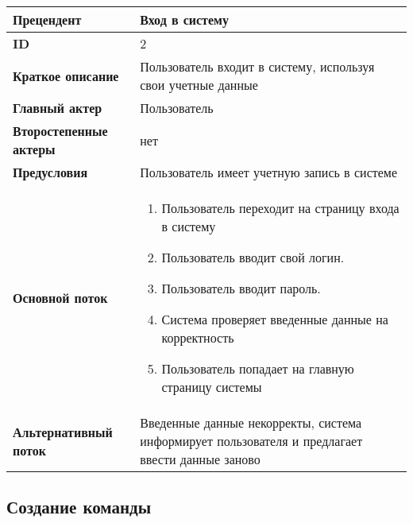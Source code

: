 \begin{tabular}{|l|p{9cm}|}
	\hline
	\textbf{Прецендент}            & Вход в систему                                                                                  \\
	\hline
	\textbf{ID}                    & 2                                                                                               \\
	\hline
	\textbf{Краткое описание}      & Пользователь входит в систему, используя свои учетные данные                                    \\
	\hline
	\textbf{Главный актер}         & Пользователь                                                                                    \\
	\hline
	\textbf{Второстепенные актеры} & нет                                                                                             \\
	\hline
	\textbf{Предусловия}           & Пользователь имеет учетную запись в системе                                                     \\
	\hline
	\textbf{Основной поток}        & \begin{enumerate}
		                                 \item Пользователь переходит на страницу входа в систему
		                                 \item Пользователь вводит свой логин.
		                                 \item Пользователь вводит пароль.
		                                 \item Система проверяет введенные данные на корректность
		                                 \item Пользователь попадает на главную страницу системы
	                                 \end{enumerate}                                         \\
	\hline
	\textbf{Альтернативный поток}  & Введенные данные некорректы, система информирует пользователя и предлагает ввести данные заново \\
	\hline
\end{tabular}

\subsection{Создание команды}

